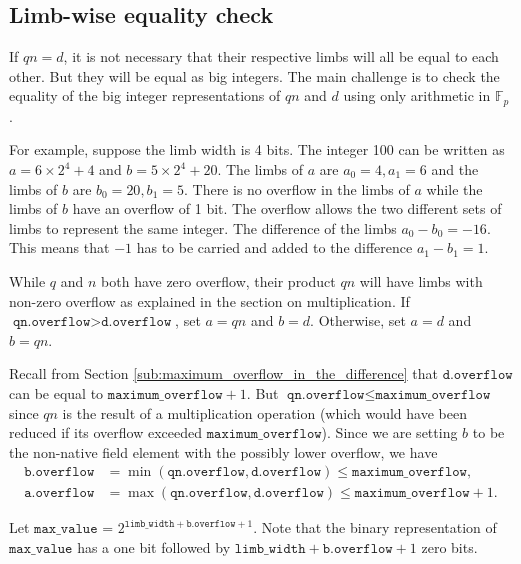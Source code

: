 \documentclass[a4paper, 12pt]{article}
\begin{document}
\subsection{Limb-wise equality check}%
\label{sub:limb_wise_equality_check}

If $qn = d$, it is not necessary that their respective limbs will all be equal to each other. But they will be equal as big integers. 
 The main challenge is to check the equality of the big integer representations of $qn$ and $d$ using only arithmetic in $\mathbb{F}_p$.

For example, suppose the limb width is 4 bits. The integer 100 can be written as $a = 6 \times 2^4 + 4$ and $b = 5 \times 2^4  +20$. The limbs of $a$ are $a_0=4, a_1=6$ and the limbs of $b$ are $b_0 = 20, b_1 =5$. There is no overflow in the limbs of $a$ while the limbs of $b$ have an overflow of 1 bit. The overflow allows the two different sets of limbs to represent the same integer. The difference of the limbs $a_0 - b_0 = -16$. This means that $-1$ has to be carried and added to the difference $a_1 - b_1 = 1$.


While $q$ and $n$ both have zero overflow, their product $qn$ will have limbs with non-zero overflow as explained in the section on multiplication. If $\texttt{qn.overflow} > \texttt{d.overflow}$, set $a = qn$ and $b = d$. Otherwise, set $a = d$ and $b = qn$.

Recall from Section \ref{sub:maximum_overflow_in_the_difference} that $\texttt{d.overflow}$ can be equal to $\texttt{maximum\_overflow} + 1$. But $\texttt{qn.overflow} \le \texttt{maximum\_overflow}$ since $qn$ is the result of a multiplication operation (which would have been reduced if its overflow exceeded $\texttt{maximum\_overflow}$). Since we are setting $b$ to be the non-native field element with the possibly lower overflow, we have
\begin{align*}
  \texttt{b.overflow} & = \min(\texttt{qn.overflow}, \texttt{d.overflow}) \le \texttt{maximum\_overflow}, \\
\texttt{a.overflow} & = \max(\texttt{qn.overflow}, \texttt{d.overflow}) \le \texttt{maximum\_overflow} + 1.
\end{align*}

Let $\texttt{max\_value}$ = $2^{\texttt{limb\_width}+\texttt{b.overflow}+1}$. Note that the binary representation of $\texttt{max\_value}$ has a one bit followed by $\texttt{limb\_width} + \texttt{b.overflow}+1$ zero bits. 
\end{document}
